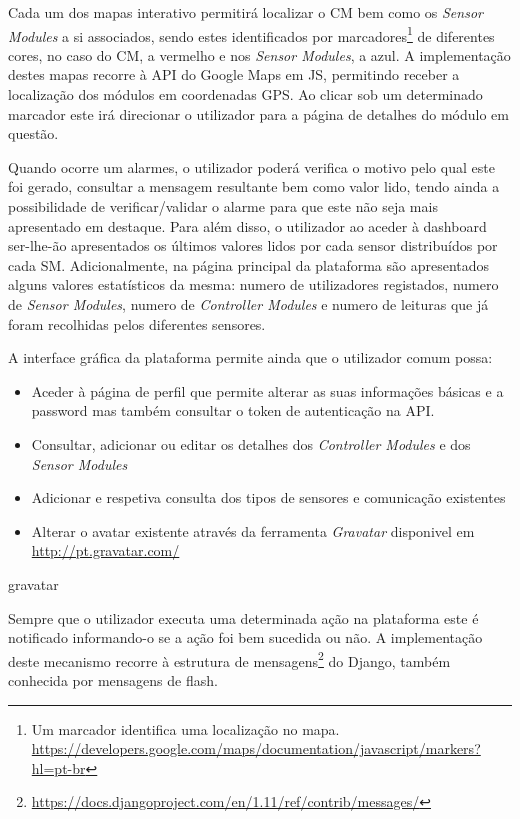 Cada um dos mapas interativo permitirá localizar o \acl{CM} bem como os \textit{Sensor Modules} a si associados, sendo estes identificados por marcadores\footnote{Um marcador identifica uma localização no mapa. \\ \url{https://developers.google.com/maps/documentation/javascript/markers?hl=pt-br}} de diferentes cores, no caso do \acl{CM}, a vermelho e nos \textit{Sensor Modules}, a azul. A implementação destes mapas recorre à \ac{API} do Google Maps em \ac{JS}, permitindo receber a localização dos módulos em coordenadas \ac{GPS}. Ao clicar sob um determinado marcador este irá direcionar o utilizador para a página de detalhes do módulo em questão. 


Quando ocorre um  alarmes, o utilizador poderá verifica o motivo pelo qual este foi gerado, consultar a mensagem resultante bem como valor lido, tendo ainda a possibilidade de verificar/validar o alarme para que este não seja mais apresentado em destaque. Para além disso, o utilizador ao aceder à dashboard ser-lhe-ão apresentados os últimos valores lidos por cada sensor distribuídos por cada \acl{SM}. Adicionalmente, na página principal da plataforma são apresentados alguns valores estatísticos da mesma: numero de utilizadores registados, numero de \textit{Sensor Modules}, numero de \textit{Controller Modules} e numero de leituras que já foram recolhidas pelos diferentes sensores. 


A interface gráfica da plataforma permite ainda que o utilizador comum possa: 

\begin{itemize}
	\item Aceder à página de perfil que permite alterar as suas informações básicas e a password mas também consultar o token de autenticação na API. 
	
	\item Consultar, adicionar ou editar os detalhes dos \textit{Controller Modules} e dos \textit{Sensor Modules}
	
	\item Adicionar e respetiva consulta dos tipos de sensores e comunicação existentes
	
	\item Alterar o avatar existente através da ferramenta \textit{Gravatar} disponivel em \url{http://pt.gravatar.com/} 
\end{itemize}




gravatar 


Sempre que o utilizador executa uma determinada ação na plataforma este é notificado informando-o se a ação foi bem sucedida ou não. A implementação deste mecanismo recorre à estrutura de mensagens\footnote{\url{https://docs.djangoproject.com/en/1.11/ref/contrib/messages/}} do Django, também conhecida por mensagens de flash. 




